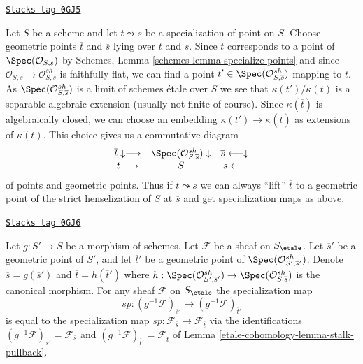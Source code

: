 \begin{remark}

\label{etale-cohomology-remark-can-lift}
\href{https://stacks.math.columbia.edu/tag/0GJ5}{\texttt{Stacks tag 0GJ5}}

Let $S$ be a scheme and let $t \leadsto s$ be a specialization of
point on $S$. Choose geometric points $\overline{t}$ and $\overline{s}$
lying over $t$ and $s$. Since $t$ corresponds to a point of
$\Spec(\mathcal{O}_{S, s})$ by
Schemes, Lemma \ref{schemes-lemma-specialize-points}
and since $\mathcal{O}_{S, s} \to \mathcal{O}^{sh}_{S, \overline{s}}$
is faithfully flat, we can find a point
$t' \in \Spec(\mathcal{O}^{sh}_{S, \overline{s}})$ mapping to $t$.
As $\Spec(\mathcal{O}^{sh}_{S, \overline{s}})$ is a limit of
schemes \'etale over $S$ we see that $\kappa(t')/\kappa(t)$
is a separable algebraic extension (usually not finite of course).
Since $\kappa(\overline{t})$ is algebraically closed, we can
choose an embedding $\kappa(t') \to \kappa(\overline{t})$
as extensions of $\kappa(t)$. This choice gives us a
commutative diagram
$$
\begin{array}{ccc}\overline{t} \downarrow\longrightarrow & \Spec(\mathcal{O}^{sh}_{S, \overline{s}}) \downarrow & \overline{s} \longleftarrow\downarrow \\ t \longrightarrow & S & s \longleftarrow\end{array}
$$
of points and geometric points. Thus if $t \leadsto s$
we can always ``lift'' $\overline{t}$ to a geometric point
of the strict henselization of $S$ at $\overline{s}$
and get specialization maps as above.
\end{remark}

\begin{lemma}
\label{etale-cohomology-lemma-specialization-map-pullback}
\href{https://stacks.math.columbia.edu/tag/0GJ6}{\texttt{Stacks tag 0GJ6}}

Let $g : S' \to S$ be a morphism of schemes. Let $\mathcal{F}$ be a sheaf
on $S_\etale$. Let $\overline{s}'$ be a geometric point of $S'$, and let
$\overline{t}'$ be a geometric point of
$\Spec(\mathcal{O}^{sh}_{S', \overline{s}'})$. Denote
$\overline{s} = g(\overline{s}')$ and $\overline{t} = h(\overline{t}')$
where $h : \Spec(\mathcal{O}^{sh}_{S', \overline{s}'}) \to
\Spec(\mathcal{O}^{sh}_{S, \overline{s}})$ is the canonical morphism.
For any sheaf $\mathcal{F}$ on $S_\etale$ the specialization map
$$
sp :
(g^{-1}\mathcal{F})_{\overline{s}'}
\longrightarrow
(g^{-1}\mathcal{F})_{\overline{t}'}
$$
is equal to the specialization map
$sp : \mathcal{F}_{\overline{s}} \to \mathcal{F}_{\overline{t}}$
via the identifications
$(g^{-1}\mathcal{F})_{\overline{s}'} = \mathcal{F}_{\overline{s}}$ and
$(g^{-1}\mathcal{F})_{\overline{t}'} = \mathcal{F}_{\overline{t}}$
of Lemma \ref{etale-cohomology-lemma-stalk-pullback}.
\end{lemma}

